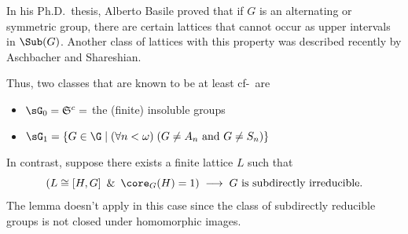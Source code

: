 \begin{frame}[label=ExamplesPreziBasile]{}
In his Ph.D.~thesis, Alberto Basile proved that if
$G$ is an alternating or symmetric group, there are certain lattices that
cannot occur as upper intervals in $\Sub(G)$. 
\vskip5mm
Another class of lattices with
this property was described recently by Aschbacher and Shareshian.
      \begin{center}
    {
        \begin{tikzpicture}[scale=.4]
          
        \end{tikzpicture}
}
      \end{center}
\end{frame}


\begin{frame}[label=ExamplesPreziTwoClasses]{}
Thus, two classes that are known to be at least cf-\IE\ are
\vskip2mm
\begin{itemize}
\item $\sG_0 = \mathfrak{S}^c = $ the (finite) insoluble groups
\vskip2mm
\item $\sG_1 =\{G\in \G \mid (\forall n<\omega) \; (G \neq A_n \text{ and }  G\neq S_n) \}$
\end{itemize}
\vskip5mm
\end{frame}


\begin{frame}[label=IEPropsSubdir]{}
In contrast, suppose %
there exists a finite lattice $L$ such that
 \[
 (L \cong [H, G] \,\text{ \& }\, \core_G(H)=1) \; \longrightarrow \; G
 \text{ is subdirectly irreducible.}  %
\]
The lemma doesn't apply in this case since the class of
subdirectly reducible groups is not closed under homomorphic 
images.
\end{frame}


